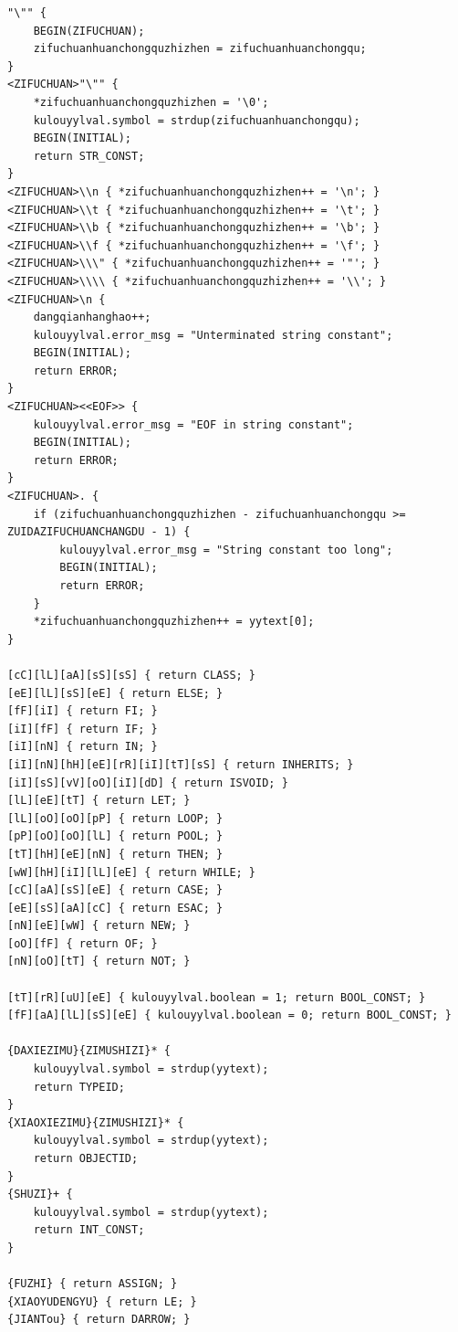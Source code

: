 \documentclass[twocolumn]{article}
\begin{document}
\begin{lstlisting}[language=Flex, caption={cool.flex 完整源码}, label=code:cool_flex]
"\"" { 
    BEGIN(ZIFUCHUAN); 
    zifuchuanhuanchongquzhizhen = zifuchuanhuanchongqu; 
}
<ZIFUCHUAN>"\"" { 
    *zifuchuanhuanchongquzhizhen = '\0';
    kulouyylval.symbol = strdup(zifuchuanhuanchongqu);
    BEGIN(INITIAL);
    return STR_CONST;
}
<ZIFUCHUAN>\\n { *zifuchuanhuanchongquzhizhen++ = '\n'; }
<ZIFUCHUAN>\\t { *zifuchuanhuanchongquzhizhen++ = '\t'; }
<ZIFUCHUAN>\\b { *zifuchuanhuanchongquzhizhen++ = '\b'; }
<ZIFUCHUAN>\\f { *zifuchuanhuanchongquzhizhen++ = '\f'; }
<ZIFUCHUAN>\\\" { *zifuchuanhuanchongquzhizhen++ = '"'; }
<ZIFUCHUAN>\\\\ { *zifuchuanhuanchongquzhizhen++ = '\\'; }
<ZIFUCHUAN>\n { 
    dangqianhanghao++; 
    kulouyylval.error_msg = "Unterminated string constant";
    BEGIN(INITIAL);
    return ERROR;
}
<ZIFUCHUAN><<EOF>> { 
    kulouyylval.error_msg = "EOF in string constant";
    BEGIN(INITIAL);
    return ERROR;
}
<ZIFUCHUAN>. { 
    if (zifuchuanhuanchongquzhizhen - zifuchuanhuanchongqu >= ZUIDAZIFUCHUANCHANGDU - 1) {
        kulouyylval.error_msg = "String constant too long";
        BEGIN(INITIAL);
        return ERROR;
    }
    *zifuchuanhuanchongquzhizhen++ = yytext[0];
}

[cC][lL][aA][sS][sS] { return CLASS; }
[eE][lL][sS][eE] { return ELSE; }
[fF][iI] { return FI; }
[iI][fF] { return IF; }
[iI][nN] { return IN; }
[iI][nN][hH][eE][rR][iI][tT][sS] { return INHERITS; }
[iI][sS][vV][oO][iI][dD] { return ISVOID; }
[lL][eE][tT] { return LET; }
[lL][oO][oO][pP] { return LOOP; }
[pP][oO][oO][lL] { return POOL; }
[tT][hH][eE][nN] { return THEN; }
[wW][hH][iI][lL][eE] { return WHILE; }
[cC][aA][sS][eE] { return CASE; }
[eE][sS][aA][cC] { return ESAC; }
[nN][eE][wW] { return NEW; }
[oO][fF] { return OF; }
[nN][oO][tT] { return NOT; }

[tT][rR][uU][eE] { kulouyylval.boolean = 1; return BOOL_CONST; }
[fF][aA][lL][sS][eE] { kulouyylval.boolean = 0; return BOOL_CONST; }

{DAXIEZIMU}{ZIMUSHIZI}* { 
    kulouyylval.symbol = strdup(yytext);
    return TYPEID;
}
{XIAOXIEZIMU}{ZIMUSHIZI}* { 
    kulouyylval.symbol = strdup(yytext);
    return OBJECTID;
}
{SHUZI}+ { 
    kulouyylval.symbol = strdup(yytext);
    return INT_CONST;
}

{FUZHI} { return ASSIGN; }
{XIAOYUDENGYU} { return LE; }
{JIANTou} { return DARROW; }


\end{lstlisting}
\end{document}

